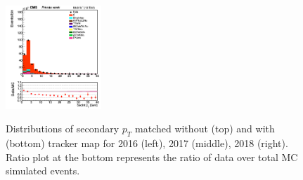 \documentclass{cernatlasnote}
\begin{document}
\begin{figure}[htp]
 \includegraphics[width=0.32\textwidth]{images/emu_channel/2018/18_Range_0pt7_1pt3/SecInt_pt_TrackerMatched_Linear.png}\\
 \caption{Distributions of secondary $p_{T}$ matched without (top) and with (bottom) tracker map for 2016 (left), 2017 (middle), 2018 (right). Ratio plot at the bottom represents the ratio of data over total MC simulated events.}
 \label{fig:L0DATAMC}
  \end{figure}
\end{document}

